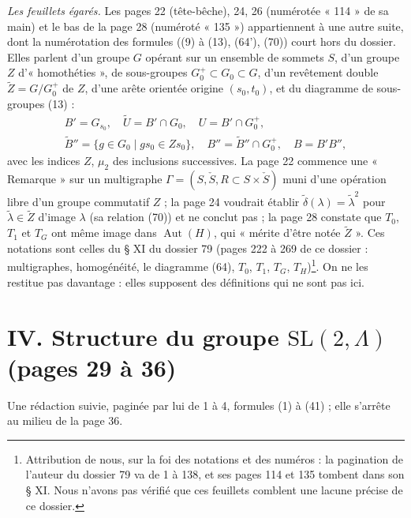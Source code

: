 \documentclass[11pt,a4paper]{article}
\begin{document}
\emph{Les feuillets égarés.} Les pages 22 (tête-bêche), 24, 26 (numérotée
« 114 » de sa main) et le bas de la page 28 (numéroté « 135 ») appartiennent à
une autre suite, dont la numérotation des formules ((9) à (13), (64'), (70))
court hors du dossier. Elles parlent d'un groupe $G$ opérant sur un ensemble de
sommets $S$, d'un groupe $Z$ d'« homothéties », de sous-groupes $G_0^{+}
\subset G_0 \subset G$, d'un revêtement double $\widetilde{Z} = G/G_0^{+}$ de
$Z$, d'une arête orientée origine $(s_0, t_0)$, et du diagramme de
sous-groupes (13) :
\[
  \begin{gathered}
  B' = G_{s_0},\quad \widetilde{U} = B' \cap G_0,\quad U = B' \cap G_0^{+},\\
  \widetilde{B}'' = \{g \in G_0 \mid gs_0 \in Z s_0\},\quad
  B'' = \widetilde{B}'' \cap G_0^{+},\quad B = B'B'',
  \end{gathered}
\]
avec les indices $Z$, $\mu_2$ des inclusions successives. La page 22 commence
une « Remarque » sur un multigraphe $\Gamma = (S, \check{S}, R \subset S
\times \check{S})$ muni d'une opération libre d'un groupe commutatif $Z$ ;
la page 24 voudrait établir $\tilde{\delta}(\lambda) = \tilde{\lambda}^2$
pour $\tilde{\lambda} \in \widetilde{Z}$ d'image $\lambda$ (sa relation (70)) et
ne conclut pas ; la page 28 constate que $T_0$, $T_1$ et $T_G$ ont même image
dans $\operatorname{Aut}(H)$, qui « mérite d'être notée $\widetilde{Z}$ ». Ces
notations sont celles du § XI du dossier 79 (pages 222 à 269 de ce dossier :
multigraphes, homogénéité, le diagramme (64), $T_0$, $T_1$, $T_G$,
$T_H$)\footnote{Attribution de nous, sur la foi des notations et des numéros :
la pagination de l'auteur du dossier 79 va de 1 à 138, et ses pages 114 et
135 tombent dans son § XI. Nous n'avons pas vérifié que ces feuillets
comblent une lacune précise de ce dossier.}. On ne les restitue pas
davantage : elles supposent des définitions qui ne sont pas ici.

\section*{IV. Structure du groupe $\mathrm{SL}(2, \Lambda)$ (pages 29 à 36)}

Une rédaction suivie, paginée par lui de 1 à 4, formules (1) à (41) ; elle
s'arrête au milieu de la page 36.
\end{document}
